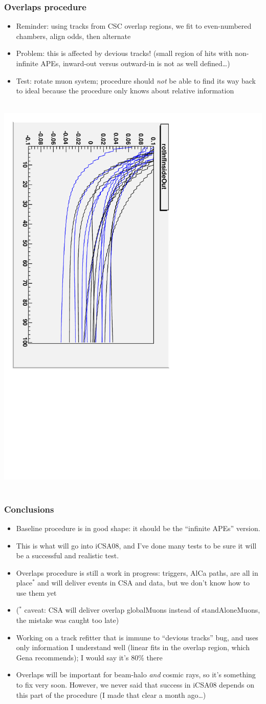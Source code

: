 \documentclass[compress]{beamer}
\begin{document}
\begin{frame}
\frametitle{Overlaps procedure}

\small
\begin{itemize}
\item Reminder: using tracks from CSC overlap regions, we fit to even-numbered chambers, align odds, then alternate
\item Problem: this is affected by devious tracks!  (small region of hits with non-infinite APEs, inward-out versus outward-in is not as well defined\ldots)
\item Test: rotate muon system; procedure should {\it not} be able to find its way back to ideal because the procedure only knows about relative information
\end{itemize}

\mbox{ } \hfill \includegraphics[height=0.6\linewidth, angle=90]{affected_by_bug.pdf} \hfill \mbox{ }
\end{frame}

\begin{frame}
\frametitle{Conclusions}

\small
\begin{itemize}\setlength{\itemsep}{0.1 cm}
\item Baseline procedure is in good shape: it should be the ``infinite APEs'' version.
\item This is what will go into iCSA08, and I've done many tests to be
sure it will be a successful and realistic test.
\item Overlaps procedure is still a work in progress: triggers, AlCa
paths, are all in place$^*$ and will deliver events in CSA and data, but
we don't know how to use them yet
\item ($^*$ caveat: CSA will deliver overlap globalMuons instead of
standAloneMuons, the mistake was caught too late)
\item Working on a track refitter that is immune to ``devious tracks''
bug, and uses only information I understand well (linear fits in the
overlap region, which Gena recommends); I would say it's 80\% there
\item Overlaps will be important for beam-halo {\it and} cosmic rays,
so it's something to fix very soon.  However, we never said that
success in iCSA08 depends on this part of the procedure (I made that
clear a month ago\ldots)
\end{itemize}
\label{numpages}
\end{frame}
\end{document}
